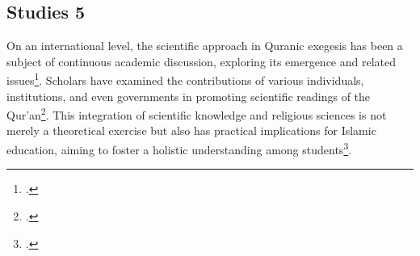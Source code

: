 		\subsection{Studies 5}
		On an international level, the scientific approach in Quranic exegesis has been a subject of continuous academic discussion, exploring its emergence and related issues\footcite{ismail2021}. Scholars have examined the contributions of various individuals, institutions, and even governments in promoting scientific readings of the Qur'an\footcite{asnawi2021}. This integration of scientific knowledge and religious sciences is not merely a theoretical exercise but also has practical implications for Islamic education, aiming to foster a holistic understanding among students\footcite{nasir2022}.